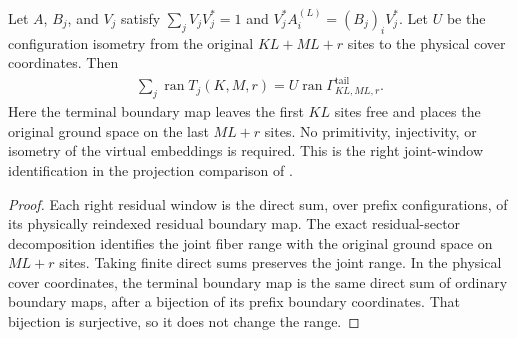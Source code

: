 \begin{lemma}
    \label{thm:residual_window_right_joint_range}
    \leanok
    Let $A$, $B_j$, and $V_j$ satisfy
    $\sum_jV_jV_j^*=1$ and $V_j^*A^{(L)}_i=(B_j)_iV_j^*$.
    Let $U$ be the configuration isometry from the original $KL+ML+r$
    sites to the physical cover coordinates. Then
    \begin{align}
        \sum_j\operatorname{ran}T_j(K,M,r)
        =U\operatorname{ran}\Gamma^{\mathrm{tail}}_{KL,ML,r}.
    \end{align}
    Here the terminal boundary map leaves the first $KL$ sites free and
    places the original ground space on the last $ML+r$ sites.
    No primitivity, injectivity, or isometry of the virtual embeddings is required.
    This is the right joint-window identification in the projection comparison of
    \cite[Lemma~commutation(ii)]{Nachtergaele1996Spectral}.
\end{lemma}
\begin{proof}\leanok
    Each right residual window is the direct sum, over prefix configurations,
    of its physically reindexed residual boundary map.
    The exact residual-sector decomposition identifies the joint fiber range
    with the original ground space on $ML+r$ sites.
    Taking finite direct sums preserves the joint range.
    In the physical cover coordinates, the terminal boundary map is the same
    direct sum of ordinary boundary maps, after a bijection of its prefix
    boundary coordinates. That bijection is surjective, so it does not change
    the range.
\end{proof}

